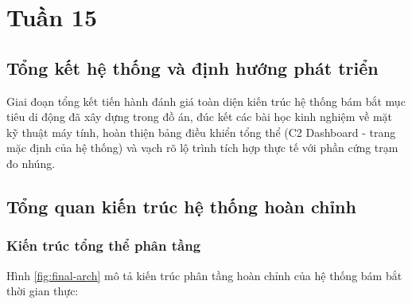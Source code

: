 \section{Tuần 15}

\subsection{Tổng kết hệ thống và định hướng phát triển}

\hspace{0.5cm} Giai đoạn tổng kết tiến hành đánh giá toàn diện kiến trúc hệ thống bám bắt mục tiêu di động đã xây dựng trong đồ án, đúc kết các bài học kinh nghiệm về mặt kỹ thuật máy tính, hoàn thiện bảng điều khiển tổng thể (C2 Dashboard - trang mặc định của hệ thống) và vạch rõ lộ trình tích hợp thực tế với phần cứng trạm đo nhúng.

\subsection{Tổng quan kiến trúc hệ thống hoàn chỉnh}

\subsubsection{Kiến trúc tổng thể phân tầng}

\hspace{0.5cm} Hình \ref{fig:final-arch} mô tả kiến trúc phân tầng hoàn chỉnh của hệ thống bám bắt thời gian thực:

